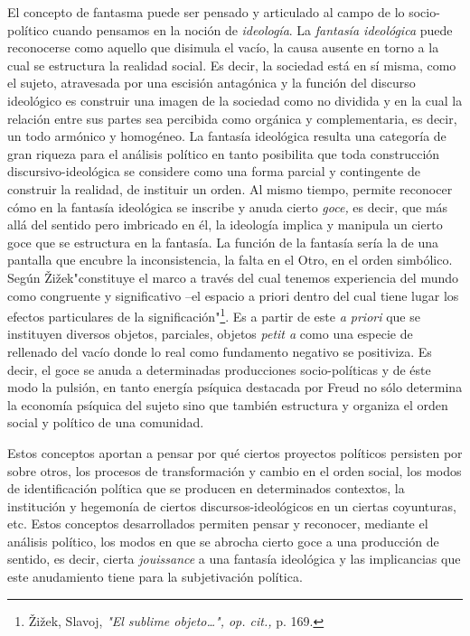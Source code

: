 \documentclass{book}
\begin{document}
El concepto de fantasma puede ser pensado y articulado al campo de lo
socio-político cuando pensamos en la noción de \emph{ideología}. La
\emph{fantasía ideológica} puede reconocerse como aquello que disimula
el vacío, la causa ausente en torno a la cual se estructura la realidad
social. Es decir, la sociedad está en sí misma, como el sujeto,
atravesada por una escisión antagónica y la función del discurso
ideológico es construir una imagen de la sociedad como no dividida y en
la cual la relación entre sus partes sea percibida como orgánica y
complementaria, es decir, un todo armónico y homogéneo. La fantasía
ideológica resulta una categoría de gran riqueza para el análisis
político en tanto posibilita que toda construcción discursivo-ideológica
se considere como una forma parcial y contingente de construir la
realidad, de instituir un orden. Al mismo tiempo, permite reconocer cómo
en la fantasía ideológica se inscribe y anuda cierto \emph{goce,} es
decir, que más allá del sentido pero imbricado en él, la ideología
implica y manipula un cierto goce que se estructura en la fantasía. La
función de la fantasía sería la de una pantalla que encubre la
inconsistencia, la falta en el Otro, en el orden simbólico. Según
Žižek"constituye el marco a través del cual tenemos experiencia del
mundo como congruente y significativo --el espacio a priori dentro del
cual tiene lugar los efectos particulares de la
significación"\footnote{Žižek, Slavoj, \emph{"El sublime objeto\ldots",
  op. cit.,} p. 169.}. Es a partir de este \emph{a priori} que se
instituyen diversos objetos, parciales, objetos \emph{petit a} como una
especie de rellenado del vacío donde lo real como fundamento negativo se
positiviza. Es decir, el goce se anuda a determinadas producciones
socio-políticas y de éste modo la pulsión, en tanto energía psíquica
destacada por Freud no sólo determina la economía psíquica del sujeto
sino que también estructura y organiza el orden social y político de una
comunidad.

Estos conceptos aportan a pensar por qué ciertos proyectos políticos
persisten por sobre otros, los procesos de transformación y cambio en el
orden social, los modos de identificación política que se producen en
determinados contextos, la institución y hegemonía de ciertos
discursos-ideológicos en un ciertas coyunturas, etc. Estos conceptos
desarrollados permiten pensar y reconocer, mediante el análisis
político, los modos en que se abrocha cierto goce a una producción de
sentido, es decir, cierta \emph{jouissance} a una fantasía ideológica y
las implicancias que este anudamiento tiene para la subjetivación
política.
\end{document}

